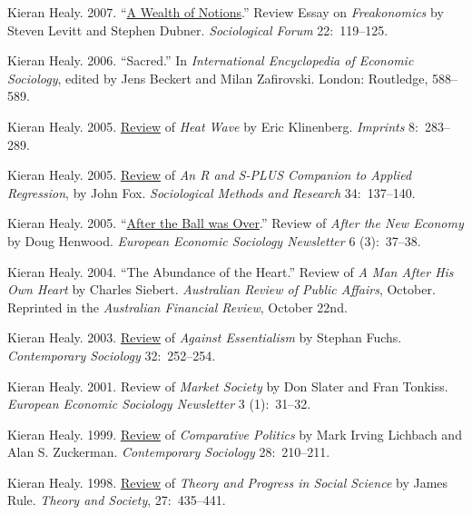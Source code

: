 \documentclass[11pt]{article}
\begin{document}
\ind Kieran Healy. 2007. ``\href{http://www.kieranhealy.org/files/reviews/socforum-article.pdf}{A Wealth of Notions}.'' Review
Essay on \emph{Freakonomics} by Steven Levitt and Stephen Dubner. \emph{Sociological Forum} 22:~119--125. 

\ind  Kieran Healy. 2006. ``Sacred.'' In \emph{International Encyclopedia of Economic Sociology}, edited by Jens Beckert and Milan Zafirovski. London: Routledge, 588--589. 

\ind  Kieran Healy. 2005. \href{http://www.kieranhealy.org/files/reviews/klinenberg.pdf}{Review} of \emph{Heat Wave} by Eric Klinenberg. \emph{Imprints} 8:~283--289.

\ind  Kieran Healy. 2005. \href{http://www.kieranhealy.org/files/reviews/fox.pdf}{Review} of \emph{An R and S-PLUS Companion to Applied Regression}, by John Fox. \emph{Sociological Methods and Research} 34:~137--140.

\ind  Kieran Healy. 2005. ``\href{http://www.kieranhealy.org/files/reviews/henwood.pdf}{After the Ball was Over}.'' Review of \emph{After the New
  Economy} by Doug Henwood. \emph{European Economic Sociology Newsletter} 6 (3):~37--38.

\ind  Kieran Healy. 2004. ``The Abundance of the Heart.'' Review of \emph{A Man After His Own Heart} by Charles
Siebert. \emph{Australian Review of Public Affairs}, October. Reprinted in the
\emph{Australian Financial Review}, October 22nd.

\ind  Kieran Healy. 2003. \href{http://links.jstor.org/sici?sici=0094-3061%28200303%2932%3A2%3C252%3AAEATOC%3E2.0.CO%3B2-F}{Review} of \emph{Against Essentialism} by Stephan Fuchs.
\emph{Contemporary Sociology} 32:~252--254.

\ind  Kieran Healy. 2001. Review of \emph{Market Society} by Don Slater and Fran Tonkiss. \emph{European
      Economic Sociology Newsletter} 3 (1):~31--32.


\ind  Kieran Healy. 1999. \href{http://links.jstor.org/sici?sici=0094-3061%28199903%2928%3A2%3C210%3ACPRCAS%3E2.0.CO%3B2-C}{Review} of \emph{Comparative Politics} by Mark Irving Lichbach and Alan S.
Zuckerman. \emph{Contemporary Sociology} 28:~210--211.


\ind  Kieran Healy. 1998. \href{http://www.kieranhealy.org/files/reviews/rule.pdf}{Review} of \emph{Theory and Progress in Social Science} by James Rule.  \emph{Theory
  and Society}, 27:~435--441.

 \bigskip
\end{document}
